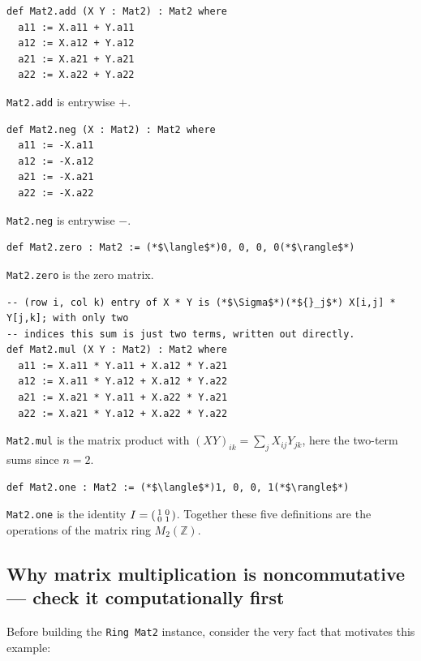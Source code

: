 \begin{lstlisting}
def Mat2.add (X Y : Mat2) : Mat2 where
  a11 := X.a11 + Y.a11
  a12 := X.a12 + Y.a12
  a21 := X.a21 + Y.a21
  a22 := X.a22 + Y.a22
\end{lstlisting}

\texttt{Mat2.add} is entrywise \(+\).

\begin{lstlisting}
def Mat2.neg (X : Mat2) : Mat2 where
  a11 := -X.a11
  a12 := -X.a12
  a21 := -X.a21
  a22 := -X.a22
\end{lstlisting}

\texttt{Mat2.neg} is entrywise \(-\).

\begin{lstlisting}
def Mat2.zero : Mat2 := (*$\langle$*)0, 0, 0, 0(*$\rangle$*)
\end{lstlisting}

\texttt{Mat2.zero} is the zero matrix.

\begin{lstlisting}
-- (row i, col k) entry of X * Y is (*$\Sigma$*)(*${}_j$*) X[i,j] * Y[j,k]; with only two
-- indices this sum is just two terms, written out directly.
def Mat2.mul (X Y : Mat2) : Mat2 where
  a11 := X.a11 * Y.a11 + X.a12 * Y.a21
  a12 := X.a11 * Y.a12 + X.a12 * Y.a22
  a21 := X.a21 * Y.a11 + X.a22 * Y.a21
  a22 := X.a21 * Y.a12 + X.a22 * Y.a22
\end{lstlisting}

\texttt{Mat2.mul} is the matrix product with \((XY)_{ik} = \sum_j X_{ij}Y_{jk}\), here the two-term sums since \(n = 2\).

\begin{lstlisting}
def Mat2.one : Mat2 := (*$\langle$*)1, 0, 0, 1(*$\rangle$*)
\end{lstlisting}

\texttt{Mat2.one} is the identity \(I = \begin{psmallmatrix}1&0\\0&1\end{psmallmatrix}\). Together these five definitions are the operations of the matrix ring \(M_2(\mathbb{Z})\).

\subsection{Why matrix multiplication is noncommutative --- check it computationally first}\label{sec:08-rings:07-matrices:2}

Before building the \texttt{Ring Mat2} instance, consider the very fact that motivates this example:

